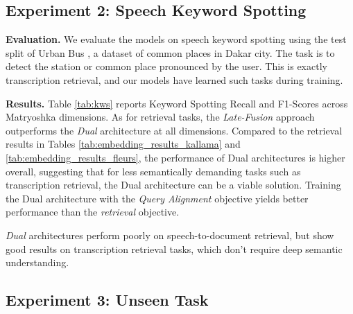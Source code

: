 \documentclass[11pt]{article}
\newcommand{\myparagraph}[1]{\noindent\textbf{#1}}
\begin{document}
\subsection{Experiment 2: Speech Keyword Spotting}
\myparagraph{Evaluation.} We evaluate the models on speech keyword spotting using the test split of Urban Bus \citep{urbanbus}, a dataset of common places in Dakar city. The task is to detect the station or common place pronounced by the user. This is exactly transcription retrieval, and our models have learned such tasks during training.

\myparagraph{Results.} Table \ref{tab:kws} reports Keyword Spotting Recall and F1-Scores across Matryoshka dimensions. As for retrieval tasks, the \textit{Late-Fusion} approach outperforms the \textit{Dual} architecture at all dimensions. Compared to the retrieval results in Tables \ref{tab:embedding_results_kallama} and \ref{tab:embedding_results_fleurs}, the performance of Dual architectures is higher overall, suggesting that for less semantically demanding tasks such as transcription retrieval, the Dual architecture can be a viable solution. Training the Dual architecture with the \textit{Query Alignment} objective yields better performance than the \textit{retrieval} objective.
\begin{tcolorbox}[compactbox,colback=violet!15!white,colframe=violet!100!white,title={\color{black} \textbf{Finding 2}: \textit{Dual} models perform well on tasks that are not semantically demanding.}]
\textit{Dual} architectures perform poorly on speech-to-document retrieval, but show good results on transcription retrieval tasks, which don't require deep semantic understanding.
\end{tcolorbox}
\subsection{Experiment 3: Unseen Task}
\label{sec:unseen_task}
\end{document}
